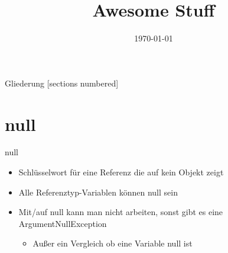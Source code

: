 



\title{Awesome Stuff}
\date{\today}




\maketitle

\begin{frame}{Gliederung}
	[sections numbered]
	\tableofcontents
\end{frame}

\section{null}
\begin{frame}{null}
	\begin{itemize}
		\item Schlüsselwort für eine Referenz die auf kein Objekt zeigt
		\item Alle Referenztyp-Variablen können \alert{null} sein
		\item Mit/auf \alert{null} kann man nicht arbeiten, sonst gibt es eine ArgumentNullException
		\begin{itemize}
			\item Außer ein Vergleich ob eine Variable \alert{null} ist
		\end{itemize}
	\end{itemize}
		
\end{frame}

